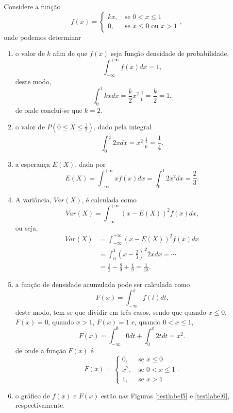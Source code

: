 \documentclass[11pt,fleqn]{book}
\numberwithin{mpicture}{chapter}
\numberwithin{mtable}{chapter}
\numberwithin{mframe}{chapter}
\begin{document}
\begin{pageWidthArea}
	\begin{example}
		\begin{multicols}{2}
			Considere a função
			\[
				f(x)=\begin{cases}
					kx\text{,}&\text{ se } 0 < x \leqslant 1\\
					0\text{,}&\text{ se } x\leqslant 0\text{ ou }x>1
				\end{cases}
				\text{,}
			\]
			onde podemos determinar
			\begin{enumerate}[label={(\alph*)}]
				\item o valor de $k$ afim de que $f(x)$ seja função densidade de probabilidade,
				\[
					\int_{-\infty}^{+\infty} f(x)dx=1
					\text{,}
				\]
				deste modo,
				\[
					\int_{0}^{1} kx dx = \frac{k}{2}x^2\Big|_{0}^{1}
									    = \frac{k}{2}
									    = 1\text{,}
				\]
				de onde conclui-se que $k=2$.
				
				\item o valor de $P(0\leqslant X\leqslant \frac{1}{2})$, dado pela integral
				\[
					\int_{0}^{\frac{1}{2}} 2x dx = x^2\Big|_{0}^{\frac{1}{2}}=\frac{1}{4}
					\text{.}
				\]
				\item a esperança $E(X)$, dada por
				\[
					E(X)=\int_{-\infty}^{+\infty}xf(x)dx
						=\int_{0}^{1}2x^2dx
						=\frac{2}{3}
					\text{.}
				\]
				
				\item A variância, $Var(X)$, é calculada como
				\[
					Var(X)=\int_{-\infty}^{+\infty} (x-E(X))^2 f(x) dx
					\text{,}
				\]
				ou seja,
				\begin{align*}
					Var(X) &=\int_{-\infty}^{+\infty} (x - E(X))^2 f(x) dx\\
						   &=\int_{0}^{1} \left (x-\frac{2}{3} \right )^2 2xdx = \cdots\\
						   &=\frac{1}{2}-\frac{8}{9}+\frac{4}{9} = \frac{1}{18}
						   \text{.}
				\end{align*}
				
				\item a função de densidade acumulada pode ser calculada como
				\[
					F(x)=\int_{-\infty}^{x} f(t)dt
					\text{,}
				\]
				deste modo, tem-se que dividir em três casos, sendo que quando $x\leqslant 0$, $F(x)=0$, quando $x>1$, $F(x)=1$ e, quando $0<x\leqslant 1$,
				\[
					F(x)=\int_{-\infty}^{0} 0dt + \int_{0}^{x}2tdt=x^2\text{.}
				\]
				de onde a função $F(x)$ é
				\[
					F(x)=\begin{cases}
						0\text{,}&\text{ se } x \leqslant 0\\
						x^2\text{,}&\text{ se } 0<x\leqslant 1\\
						1\text{,}&\text{ se } x > 1
					\end{cases}
					\text{.}
				\]
				
				\item o gráfico de $f(x)$ e $F(x)$ estão nas Figuras \ref{testlabel5} e \ref{testlabel6}, respectivamente.
			\end{enumerate}	
		\end{multicols}
	\end{example}
\end{pageWidthArea}
\end{document}

